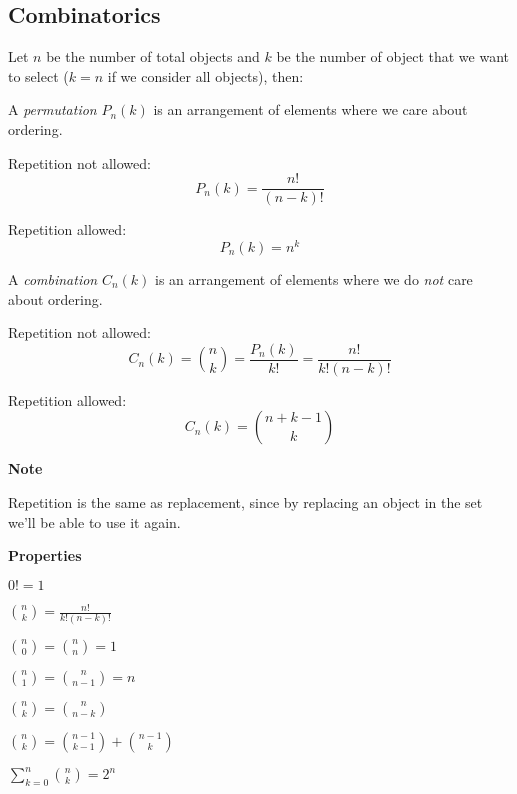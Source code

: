 \documentclass[8pt,a4paper]{extarticle}     %
\newcommand{\colfill}{\vfill\eject\columnbreak}
\begin{document}
\begin{multicols}{4}
\section{Combinatorics}
Let $n$ be the number of total objects and $k$ be the number of object that we want to select ($k=n$ if we consider all objects), then:\\
\begin{boxdefinition}[Permutation]
	A \textit{permutation} $P_n(k)$ is an arrangement of elements where we care about ordering.
	\begin{listnr}
		\item Repetition not allowed:
		\[
			P_n(k)=\frac{n!}{(n-k)!}
		\]
		\item Repetition allowed:
		\[
			P_n(k)=n^k 
		\]
	\end{listnr}
\end{boxdefinition}

\begin{boxdefinition}[Combination] 
	A \textit{combination} $C_n(k)$ is an arrangement of elements where we do \textit{not} care about ordering.
	\begin{listnr}
		\item Repetition not allowed:
		\[
			C_n(k)={n \choose k}=\frac{P_n(k)}{k!}=\frac{n!}{k!(n-k)!}
		\]
		\item Repetition allowed:
		\[
			C_n(k)={n+k-1 \choose k}
		\]
	\end{listnr}
\end{boxdefinition}
\begin{listb}
	\item [] \textbf{Note}
	\item Repetition is the same as replacement, since by replacing an object in the set we'll be able to use it again.
	\item [] \textbf{Properties}
	\item $0! = 1$ 
	\item ${n \choose k}=\frac{n!}{k!(n-k)!}$
	\item ${n \choose 0} = {n \choose n} = 1$
	\item ${n \choose 1} = {n \choose n-1} = n$
	\item ${n \choose k} = {n \choose n-k}$
	\item ${n \choose k} = {n-1 \choose k-1}+{n-1 \choose k}$ 
	\item $\sum_{k=0}^{n}{n \choose k} = 2^n$ 
\end{listb}

\colfill


\end{multicols}
\end{document}
